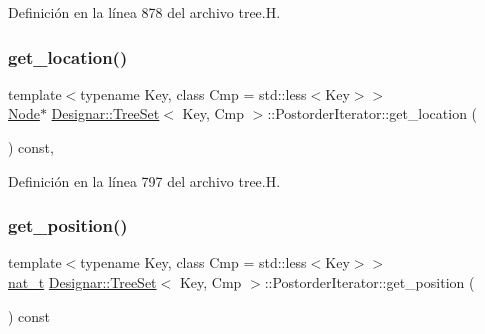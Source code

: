 Definición en la línea 878 del archivo tree.\+H.

\mbox{\label{class_designar_1_1_tree_set_1_1_postorder_iterator_abd9ef4eeb3e56c101dbf32b15253b56e}} 
\subsubsection{\texorpdfstring{get\+\_\+location()}{get\_location()}}
{\footnotesize\ttfamily template$<$typename Key, class Cmp = std\+::less$<$\+Key$>$$>$ \\
\hyperlink{class_designar_1_1_tree_set_a7409a9c1545c0e9e2fd6b84120713c99}{Node}$\ast$ \hyperlink{class_designar_1_1_tree_set}{Designar\+::\+Tree\+Set}$<$ Key, Cmp $>$\+::Postorder\+Iterator\+::get\+\_\+location (\begin{DoxyParamCaption}{ }\end{DoxyParamCaption}) const\hspace{0.3cm}{\ttfamily [inline]}, {\ttfamily [protected]}}



Definición en la línea 797 del archivo tree.\+H.

\mbox{\label{class_designar_1_1_tree_set_1_1_postorder_iterator_a09170166eaa3f2dfa50975ea14d99270}} 
\subsubsection{\texorpdfstring{get\+\_\+position()}{get\_position()}}
{\footnotesize\ttfamily template$<$typename Key, class Cmp = std\+::less$<$\+Key$>$$>$ \\
\hyperlink{namespace_designar_aa72662848b9f4815e7bf31a7cf3e33d1}{nat\+\_\+t} \hyperlink{class_designar_1_1_tree_set}{Designar\+::\+Tree\+Set}$<$ Key, Cmp $>$\+::Postorder\+Iterator\+::get\+\_\+position (\begin{DoxyParamCaption}{ }\end{DoxyParamCaption}) const\hspace{0.3cm}{\ttfamily [inline]}}



